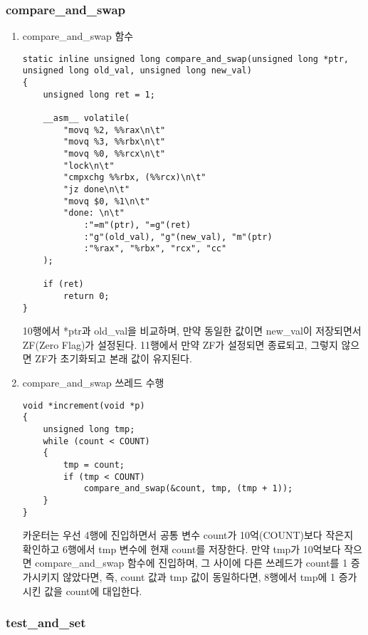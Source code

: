 \documentclass[11pt, a4paper]{article}
\begin{document}
\subsubsection{compare\_and\_swap}
\begin{enumerate}
\item compare\_and\_swap 함수

\begin{lstlisting}
static inline unsigned long compare_and_swap(unsigned long *ptr, unsigned long old_val, unsigned long new_val)
{
	unsigned long ret = 1;

	__asm__ volatile(
		"movq %2, %%rax\n\t"
		"movq %3, %%rbx\n\t"
		"movq %0, %%rcx\n\t"
		"lock\n\t"
		"cmpxchg %%rbx, (%%rcx)\n\t"
		"jz done\n\t"
		"movq $0, %1\n\t"
		"done: \n\t"
			:"=m"(ptr), "=g"(ret)
			:"g"(old_val), "g"(new_val), "m"(ptr)
			:"%rax", "%rbx", "rcx", "cc"
	);

	if (ret)
		return 0;
}
\end{lstlisting}

10행에서 *ptr과 old\_val을 비교하며, 만약 동일한 값이면 new\_val이 저장되면서 ZF(Zero Flag)가 설정된다. 11행에서 만약 ZF가 설정되면 종료되고, 그렇지 않으면 ZF가 초기화되고 본래 값이 유지된다.

\item compare\_and\_swap 쓰레드 수행

\begin{lstlisting}
void *increment(void *p)
{
	unsigned long tmp;
	while (count < COUNT)
	{
		tmp = count;
		if (tmp < COUNT)
			compare_and_swap(&count, tmp, (tmp + 1));
	}
}
\end{lstlisting}

카운터는 우선 4행에 진입하면서 공통 변수 count가 10억(COUNT)보다 작은지 확인하고 6행에서 tmp 변수에 현재 count를 저장한다. 만약 tmp가 10억보다 작으면 compare\_and\_swap 함수에 진입하며, 그 사이에 다른 쓰레드가 count를 1 증가시키지 않았다면, 즉, count 값과 tmp 값이 동일하다면, 8행에서 tmp에 1 증가시킨 값을 count에 대입한다.

\end{enumerate}

\subsubsection{test\_and\_set}
\end{document}
